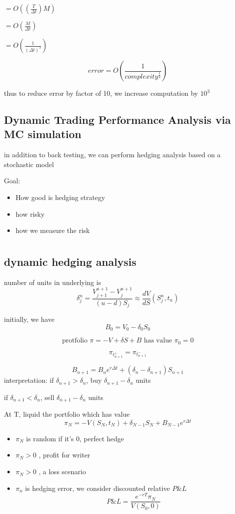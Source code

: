 \documentclass[10pt]{article}
\theoremstyle{break}
\begin{document}
        $=O((\frac{T}{\Delta t})M)$

        $=O(\frac{M}{\Delta t})$

        $=O(\frac{1}{(\Delta t)^3})$

        $$error=O(\frac{1}{complexity^{\frac{1}{3}}})$$

        thus to reduce error by factor of 10, we increase computation by $10^3$
    \subsection{Dynamic Trading Performance Analysis via MC simulation}

        in addition to back testing, we can perform hedging analysis based on
        a stochastic model

        Goal:\begin{itemize}
            \item How good is hedging strategy 
            \item how risky
            \item how we measure the risk
        \end{itemize}
\section{}
\subsection{dynamic hedging analysis}
    number of units in underlying is $$\delta^n_j=\frac{V^{n+1}_{j+1}-V_j^{n+1}}{(u-d)S_j}
    \approx \frac{dV}{dS}(S_j^n, t_n)$$

    initially, we have $$B_0=V_0-\delta_0S_0$$

    $$\text{protfolio }\pi = -V+\delta S+B\text{ has value }\pi_0=0$$

    $$\pi_{t_{n+1}^+} = \pi_{t_{n+1}^-}$$

    $$B_{n+1}=B_ne^{r\Delta t}+(\delta_n-\delta_{n+1})S_{n+1}$$
    interpretation: if $\delta_{n+1}>\delta_n$, buy $\delta_{n+1}-\delta_n$ units

    if $\delta_{n+1}<\delta_n$, sell $\delta_{n+1}-\delta_n$ units

    At T, liquid the portfolio which has value $$\pi_N=-V(S_N,t_N)+\delta_{N-1}S_N+B_{N-1}e^{r\Delta t}$$

    \begin{itemize}
        \item $\pi_N$ is random if it's 0, perfect hedge
        \item $\pi_N > 0$ , profit for writer
        \item $\pi_N > 0$ , a loss scenario 
        \item $\pi_n$ is hedging error, we consider discounted relative $P\&L$
         $$P\&L=\frac{e^{-rT}\pi_N}{V(S_0,0)}$$
    \end{itemize}
\end{document}
